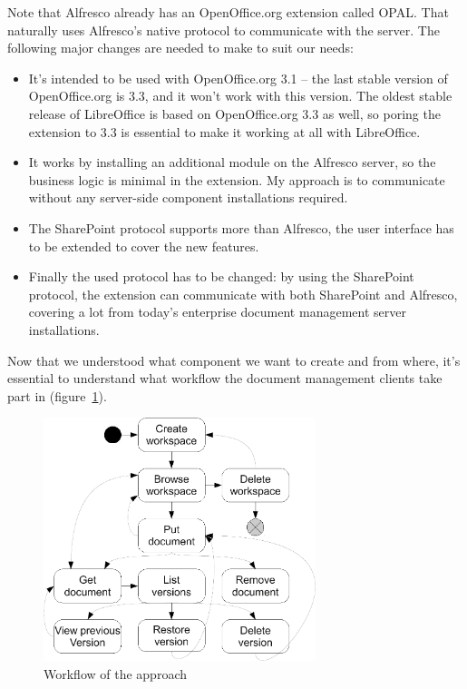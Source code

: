 Note that Alfresco already has an OpenOffice.org extension called
OPAL\cite{opal}. That naturally uses Alfresco's native protocol to communicate
with the server. The following major changes are needed to make to suit our
needs:

\begin{itemize}
\item It's intended to be used with OpenOffice.org 3.1 -- the last stable
version of OpenOffice.org is 3.3, and it won't work with this version. The
oldest stable release of LibreOffice is based on OpenOffice.org 3.3 as well, so
poring the extension to 3.3 is essential to make it working at all with
LibreOffice.
\item It works by installing an additional module on the Alfresco server, so
the business logic is minimal in the extension. My approach is to communicate
without any server-side component installations required.
\item The SharePoint protocol supports more than Alfresco, the user interface
has to be extended to cover the new features.
\item Finally the used protocol has to be changed: by using the SharePoint
protocol, the extension can communicate with both SharePoint and Alfresco,
covering a lot from today's enterprise document management server
installations.
\end{itemize}

Now that we understood what component we want to create and from where, it's
essential to understand what workflow the document management clients take part
in (figure~\ref{fig:overview-workflow}).

\begin{figure}[H]
\centering
\includegraphics[width=300px,keepaspectratio]{overview-workflow.pdf}
\caption{Workflow of the approach}
\label{fig:overview-workflow}
\end{figure}

